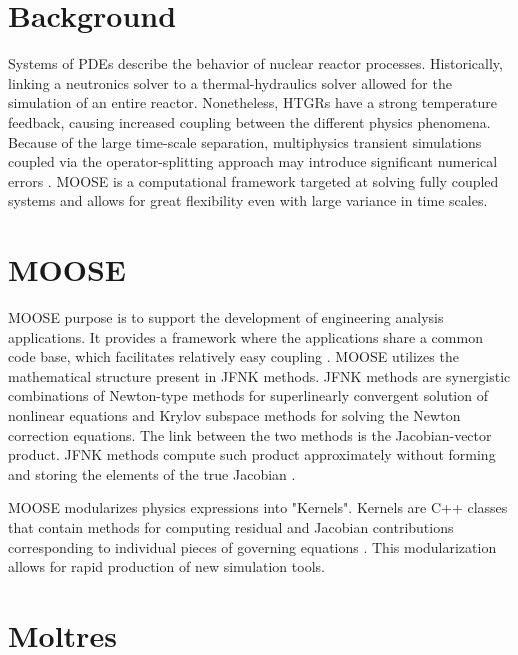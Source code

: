 \documentclass[11pt,letterpaper]{article}
\begin{document}
\section{Background}


Systems of \glspl{PDE} describe the behavior of nuclear reactor processes.
Historically, linking a neutronics solver to a thermal-hydraulics solver allowed for the simulation of an entire reactor.
Nonetheless, \glspl{HTGR} have a strong temperature feedback, causing increased coupling between the different physics phenomena.
Because of the large time-scale separation, multiphysics transient simulations coupled via the operator-splitting approach may introduce significant numerical errors \cite{ragusa_consistent_2009} \cite{park_tightly_2010}.
\gls{MOOSE} \cite{gaston_moose_2009} is a computational framework targeted at solving fully coupled systems and allows for great flexibility even with large variance in time scales.

\section{MOOSE}

\gls{MOOSE} purpose is to support the development of engineering analysis applications.
It provides a framework where the applications share a common code base, which facilitates relatively easy coupling \cite{novak_pronghorn_2018}.
\gls{MOOSE} utilizes the mathematical structure present in \gls{JFNK} methods.
\gls{JFNK} methods are synergistic combinations of Newton-type methods for superlinearly convergent solution of nonlinear equations and Krylov subspace methods for solving the Newton correction equations.
The link between the two methods is the Jacobian-vector product.
\gls{JFNK} methods compute such product approximately without forming and storing the elements of the true Jacobian \cite{knoll_jacobian-free_2004}.

\gls{MOOSE} modularizes physics expressions into "Kernels".
Kernels are C++ classes that contain methods for computing residual and Jacobian contributions corresponding to individual pieces of governing equations \cite{lindsay_introduction_2018}.
This modularization allows for rapid production of new simulation tools.

\section{Moltres}
\end{document}
